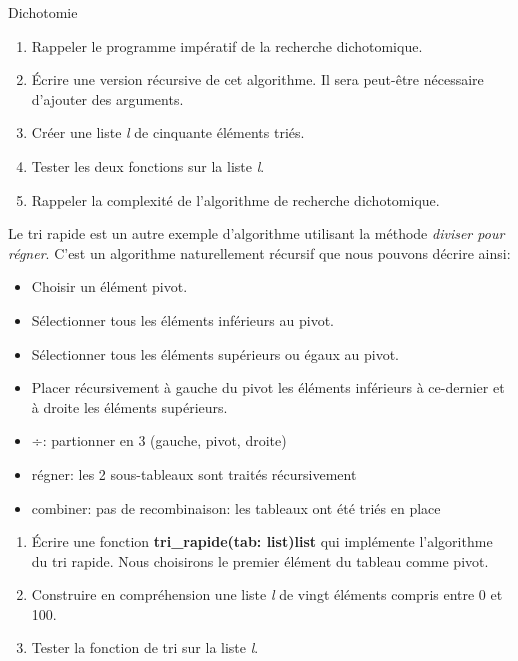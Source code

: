 \documentclass[a4paper,11pt]{article}
\begin{document}
\begin{Form}
\begin{exo}Dichotomie
\begin{enumerate}
\item Rappeler le programme impératif de la recherche dichotomique.
\item Écrire une version récursive de cet algorithme. Il sera peut-être nécessaire d'ajouter des arguments.
\item Créer une liste \emph{l} de cinquante éléments triés.
\item Tester les deux fonctions sur la liste \emph{l}.
\item Rappeler la complexité de l'algorithme de recherche dichotomique.
\end{enumerate}
\end{exo}
\begin{exo}
Le tri rapide est un autre exemple d'algorithme utilisant la méthode \emph{diviser pour régner}. C'est un algorithme naturellement récursif que nous pouvons décrire ainsi:
\begin{itemize}
\item Choisir un élément pivot.
\item Sélectionner tous les éléments inférieurs au pivot.
\item Sélectionner tous les éléments supérieurs ou égaux au pivot.
\item Placer récursivement à gauche du pivot les éléments inférieurs à ce-dernier et à droite les éléments supérieurs.
\end{itemize}
\begin{commentprof}
\begin{itemize}
\item ÷: partionner en 3 (gauche, pivot, droite)
\item régner: les 2 sous-tableaux sont traités récursivement
\item combiner: pas de recombinaison: les tableaux ont été triés en place
\end{itemize}
\end{commentprof}
\begin{enumerate}
\item Écrire une fonction \textbf{tri\_rapide(tab: list)\;\rightarrow\;list} qui implémente l'algorithme du tri rapide. Nous choisirons le premier élément du tableau comme pivot.
\item Construire en compréhension une liste \emph{l} de vingt éléments compris entre 0 et 100.
\item Tester la fonction de tri sur la liste \emph{l}.

\end{enumerate}
\end{exo}
\end{Form}
\end{document}
